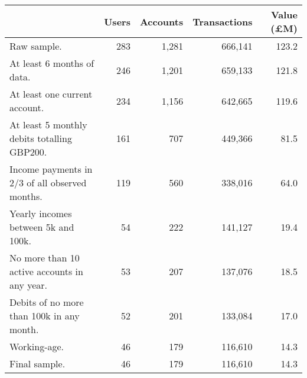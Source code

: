 \begin{tabular}{lrrrr}
\toprule
                                               & Users & Accounts & Transactions & Value (\pounds M) \\
\midrule
                                   Raw sample. &   283 &    1,281 &      666,141 &             123.2 \\
                    At least 6 months of data. &   246 &    1,201 &      659,133 &             121.8 \\
                 At least one current account. &   234 &    1,156 &      642,665 &             119.6 \\
   At least 5 monthly debits totalling GBP200. &   161 &      707 &      449,366 &              81.5 \\
Income payments in 2/3 of all observed months. &   119 &      560 &      338,016 &              64.0 \\
           Yearly incomes between 5k and 100k. &    54 &      222 &      141,127 &              19.4 \\
  No more than 10 active accounts in any year. &    53 &      207 &      137,076 &              18.5 \\
     Debits of no more than 100k in any month. &    52 &      201 &      133,084 &              17.0 \\
                                  Working-age. &    46 &      179 &      116,610 &              14.3 \\
                                 Final sample. &    46 &      179 &      116,610 &              14.3 \\
\bottomrule
\end{tabular}
